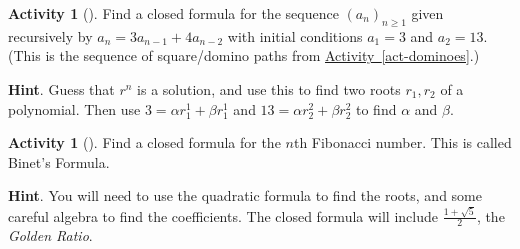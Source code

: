 \documentclass[10pt,]{book}
\theoremstyle{plain}
\theoremstyle{definition}
\theoremstyle{definition}
\theoremstyle{definition}
\newtheorem{activity}[project]{Activity}
\numberwithin{equation}{chapter}
\begin{document}
\begin{activity}[]\label{activity-142}
\hypertarget{p-955}{}%
Find a closed formula for the sequence \((a_n)_{n \ge 1}\) given recursively by \(a_n = 3a_{n-1} + 4a_{n-2}\) with initial conditions \(a_1 = 3\) and \(a_2 = 13\).  (This is the sequence of square/domino paths from \hyperref[act-dominoes]{Activity~\ref{act-dominoes}}.)%
\par\smallskip%
\noindent\textbf{Hint}.\hypertarget{hint-108}{}\quad%
\hypertarget{p-956}{}%
Guess that \(r^n\) is a solution, and use this to find two roots \(r_1, r_2\) of a polynomial.  Then use \(3 = \alpha r_1^1 + \beta r_1^1\) and \(13 = \alpha r_2^2 + \beta r_2^2\) to find \(\alpha\) and \(\beta\).%
\end{activity}
\begin{activity}[]\label{act-binet}
\hypertarget{p-957}{}%
Find a closed formula for the \(n\)th Fibonacci number.  This is called Binet's Formula.%
\par\smallskip%
\noindent\textbf{Hint}.\hypertarget{hint-109}{}\quad%
\hypertarget{p-958}{}%
You will need to use the quadratic formula to find the roots, and some careful algebra to find the coefficients.  The closed formula will include \(\frac{1+\sqrt{5}}{2}\), the \emph{Golden Ratio}.%
\end{activity}
\typeout{************************************************}
\typeout{************************************************}
\end{document}
